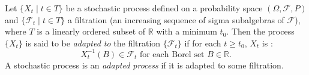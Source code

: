 \documentclass[12pt]{article}
\begin{document}
Let $\lbrace X_t \mid t\in T\rbrace$ be a stochastic process defined on a probability space $(\Omega,\mathcal{F},P)$ and $\lbrace \mathcal{F}_t \mid t\in T\rbrace$ a filtration (an increasing sequence of sigma subalgebras of $\mathcal{F}$), where $T$ is a linearly ordered subset of $\mathbb{R}$ with a minimum $t_0$.  Then the process $\lbrace X_t\rbrace$ is said to be \emph{adapted to} the filtration $\lbrace \mathcal{F}_t\rbrace$ if for each $t\ge t_0$, $X_t$ is :
$$X_t^{-1}(B)\in \mathcal{F}_t\mbox{ for each Borel set }B\in\mathbb{R}.$$
A stochastic process is an \emph{adapted process} if it is adapted to some filtration.
\end{document}

